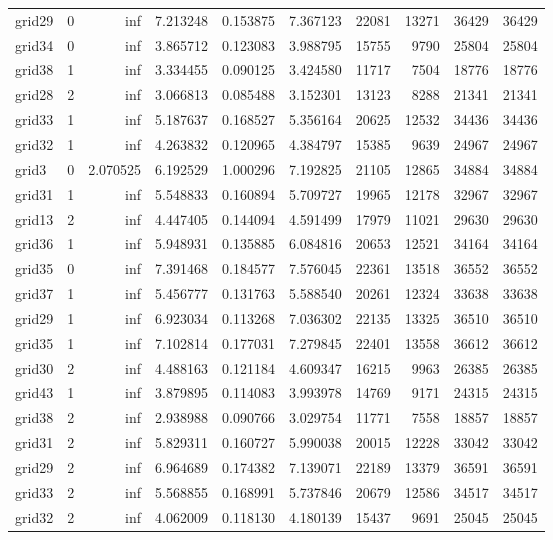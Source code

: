 \begin{longtable}{|l|r|r|r|r|r|r|r|r|r|}
grid29 & 0 & inf & 7.213248 & 0.153875 & 7.367123 & 22081 & 13271 & 36429 & 36429 \\
grid34 & 0 & inf & 3.865712 & 0.123083 & 3.988795 & 15755 & 9790 & 25804 & 25804 \\
grid38 & 1 & inf & 3.334455 & 0.090125 & 3.424580 & 11717 & 7504 & 18776 & 18776 \\
grid28 & 2 & inf & 3.066813 & 0.085488 & 3.152301 & 13123 & 8288 & 21341 & 21341 \\
grid33 & 1 & inf & 5.187637 & 0.168527 & 5.356164 & 20625 & 12532 & 34436 & 34436 \\
grid32 & 1 & inf & 4.263832 & 0.120965 & 4.384797 & 15385 & 9639 & 24967 & 24967 \\
grid3 & 0 & 2.070525 & 6.192529 & 1.000296 & 7.192825 & 21105 & 12865 & 34884 & 34884 \\
grid31 & 1 & inf & 5.548833 & 0.160894 & 5.709727 & 19965 & 12178 & 32967 & 32967 \\
grid13 & 2 & inf & 4.447405 & 0.144094 & 4.591499 & 17979 & 11021 & 29630 & 29630 \\
grid36 & 1 & inf & 5.948931 & 0.135885 & 6.084816 & 20653 & 12521 & 34164 & 34164 \\
grid35 & 0 & inf & 7.391468 & 0.184577 & 7.576045 & 22361 & 13518 & 36552 & 36552 \\
grid37 & 1 & inf & 5.456777 & 0.131763 & 5.588540 & 20261 & 12324 & 33638 & 33638 \\
grid29 & 1 & inf & 6.923034 & 0.113268 & 7.036302 & 22135 & 13325 & 36510 & 36510 \\
grid35 & 1 & inf & 7.102814 & 0.177031 & 7.279845 & 22401 & 13558 & 36612 & 36612 \\
grid30 & 2 & inf & 4.488163 & 0.121184 & 4.609347 & 16215 & 9963 & 26385 & 26385 \\
grid43 & 1 & inf & 3.879895 & 0.114083 & 3.993978 & 14769 & 9171 & 24315 & 24315 \\
grid38 & 2 & inf & 2.938988 & 0.090766 & 3.029754 & 11771 & 7558 & 18857 & 18857 \\
grid31 & 2 & inf & 5.829311 & 0.160727 & 5.990038 & 20015 & 12228 & 33042 & 33042 \\
grid29 & 2 & inf & 6.964689 & 0.174382 & 7.139071 & 22189 & 13379 & 36591 & 36591 \\
grid33 & 2 & inf & 5.568855 & 0.168991 & 5.737846 & 20679 & 12586 & 34517 & 34517 \\
grid32 & 2 & inf & 4.062009 & 0.118130 & 4.180139 & 15437 & 9691 & 25045 & 25045 \\

\end{longtable}
